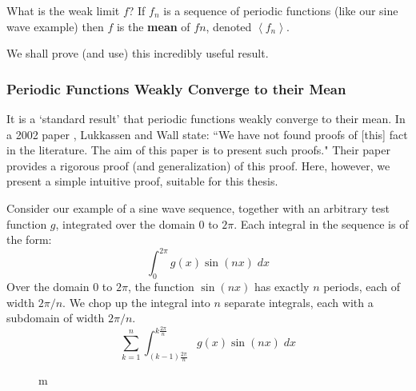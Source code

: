 \documentclass[12pt, a4paper, twoside, openright]{book}
\begin{document}
What is the weak limit $f$?  If $f_n$ is a sequence of periodic functions (like our sine wave example) then $f$ is the \textbf{mean} of $fn$, denoted $\left< f_n \right>  $.

We shall prove (and use) this incredibly useful result.

\subsubsection*{Periodic Functions Weakly Converge to their Mean}

It is a `standard result' that periodic functions weakly converge to their mean.  In a 2002 paper \cite{Lukkassen2002}, Lukkassen and Wall state: ``We have not found proofs of [this] fact in the literature.  The aim of this paper is to present such proofs."  Their paper provides a rigorous proof (and generalization) of this proof.  Here, however, we present a simple intuitive proof, suitable for this thesis.

\vspace{1em}

Consider our example of a sine wave sequence, together with an arbitrary test function $g$, integrated over the domain $0$ to $2 \pi$.
Each integral in the sequence is of the form:
\begin{equation}
\int_0^{2\pi} g(x) \sin(nx) \;dx
\end{equation}
Over the domain $0$ to $2\pi$, the function $\sin(nx)$ has exactly $n$ periods, each of width $2\pi /n$.
We chop up the integral into $n$ separate integrals, each with a subdomain of width $2\pi/n$.
\begin{equation}
\sum_{k=1}^n  \int_{(k-1) \frac{2\pi}{n}}^{k \frac{2\pi}{n}} g(x) \sin(nx) \;dx
\end{equation}

\begin{figure}[ht]
\centering
{}
\caption{m}\label{m}
\end{figure}
\end{document}
